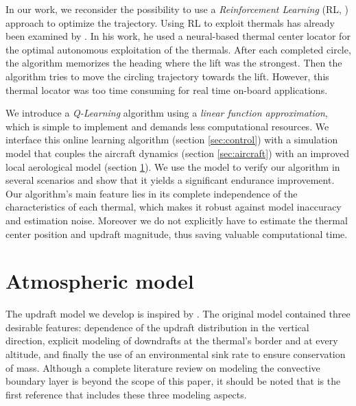 \documentclass{ifacconf}
\begin{document}
In our work, we reconsider the possibility to use a \emph{Reinforcement Learning} (RL, \cite{sutton_book}) approach to optimize the trajectory. Using RL to exploit thermals has already been examined by \cite{wharington_phd}. In his work, he used a neural-based thermal center locator for the optimal autonomous exploitation of the thermals. After each completed circle, the algorithm memorizes the heading where the lift was the strongest. Then the algorithm tries to move the circling trajectory towards the lift. However, this thermal locator was too time consuming for real time on-board applications.

We introduce a \emph{Q-Learning} algorithm using a \emph{linear function approximation}, which is simple to implement and demands less computational resources.
We interface this online learning algorithm (section \ref{sec:control}) with a simulation model that couples the aircraft dynamics (section \ref{sec:aircraft}) with an improved local aerological model (section \ref{sec:atmos}).
We use the model to verify our algorithm in several scenarios and show that it yields a significant endurance improvement. Our algorithm's main feature lies in its complete independence of the characteristics of each thermal, which makes it robust against model inaccuracy and estimation noise. Moreover we do not explicitly have to estimate the thermal center position and updraft magnitude, thus saving valuable computational time.

\section{Atmospheric model}
\label{sec:atmos}

The updraft model we develop is inspired by \cite{allen_thermal}. The original model contained three desirable features: dependence of the updraft distribution in the vertical direction, explicit modeling of downdrafts at the thermal's border and at every altitude, and finally the use of an environmental sink rate to ensure conservation of mass. Although a complete literature review on modeling the convective boundary layer is beyond the scope of this paper, it should be noted that \cite{allen_thermal} is the first reference that includes these three modeling aspects.
\end{document}
